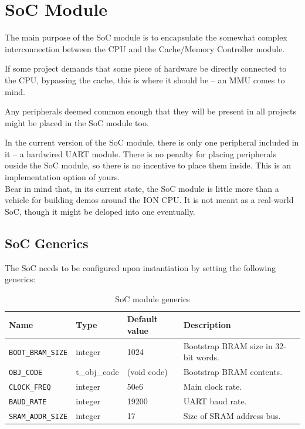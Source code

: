 
\chapter{SoC Module}
\label{soc_module}

The main purpose of the SoC module is to encapsulate the somewhat complex 
interconnection between the CPU and the Cache/Memory Controller module.

If some project demands that some piece of hardware be directly connected to the
CPU, bypassing the cache, this is where it should be -- an MMU comes to mind.

Any peripherals deemed common enough that they will be present in all projects
might be placed in the SoC module too.

In the current version of the SoC module, there is only one peripheral included 
in it -- a hardwired UART module. There is no penalty for placing peripherals 
ouside the SoC module, so there is no incentive to place them inside. This is 
an implementation option of yours.\\

Bear in mind that, in its current state, the SoC module is little more than a 
vehicle for building demos around the ION CPU. It is not meant as a real-world
SoC, though it might be deloped into one eventually.

\section{SoC Generics}
\label{soc_generics}

    The SoC needs to be configured upon instantiation by setting the following
    generics:

\begin{table}[h]
\caption{SoC module generics\label{tab_soc_generics}}
\begin{tabularx}{\textwidth}{ lll|X }
\toprule
Name & Type & Default value & Description \\
\midrule
\texttt{BOOT\_BRAM\_SIZE}      & integer    & 1024  & Bootstrap BRAM size in 32-bit words. \\
\texttt{OBJ\_CODE}     & t\_obj\_code & (void code) & Bootstrap BRAM contents. \\
\midrule
\texttt{CLOCK\_FREQ}   & integer    & 50e6  & Main clock rate. \\
\texttt{BAUD\_RATE}    & integer    & 19200  & UART baud rate. \\
\midrule
\texttt{SRAM\_ADDR\_SIZE} & integer & 17 & Size of SRAM address bus. \\
\bottomrule
\end{tabularx}
\end{table}   

